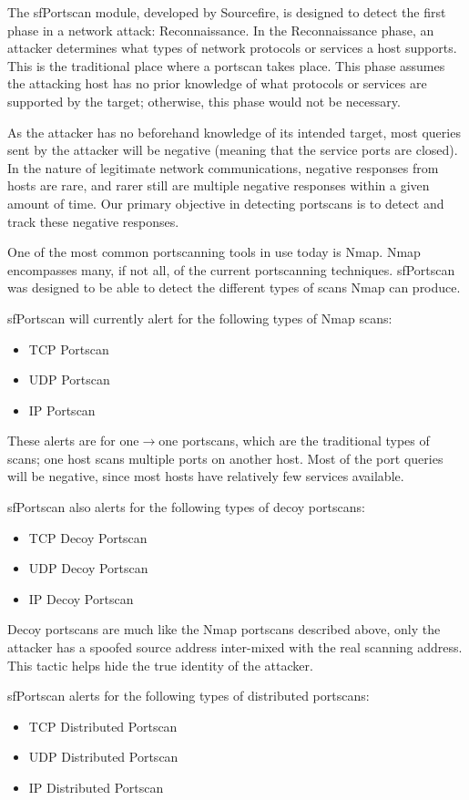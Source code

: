 \documentclass[english]{report}
\begin{document}
The sfPortscan module, developed by Sourcefire, is designed to detect the 
first phase in a network attack: Reconnaissance. In the Reconnaissance phase, 
an attacker determines
what types of network protocols or services a host supports. This is
the traditional place where a portscan takes place. This phase assumes
the attacking host has no prior knowledge of what protocols or
services are supported by the target; otherwise, this phase would not
be necessary.

As the attacker has no beforehand knowledge of its intended target,
most queries sent by the attacker will be negative (meaning that the
service ports are closed). In the nature of legitimate network
communications, negative responses from hosts are rare, and rarer
still are multiple negative responses within a given amount of time.
Our primary objective in detecting portscans is to detect and track
these negative responses.

One of the most common portscanning tools in use today is Nmap. Nmap
encompasses many, if not all, of the current portscanning techniques.
sfPortscan was designed to be able to detect the different types of
scans Nmap can produce.

sfPortscan will currently alert for the following types of Nmap scans:
\begin{itemize}
\item TCP Portscan
\item UDP Portscan
\item IP Portscan
\end{itemize}

These alerts are for one$\rightarrow$one portscans, which are the traditional
types of scans; one host scans multiple ports on another host. Most of
the port queries will be negative, since most hosts have relatively
few services available.

sfPortscan also alerts for the following types of decoy portscans:
\begin{itemize}
\item TCP Decoy Portscan
\item UDP Decoy Portscan
\item IP Decoy Portscan
\end{itemize}

Decoy portscans are much like the Nmap portscans described above, only the attacker has a spoofed
source address inter-mixed with the real scanning address. This tactic
helps hide the true identity of the attacker.

sfPortscan alerts for the following types of distributed portscans:
\begin{itemize}
\item TCP Distributed Portscan
\item UDP Distributed Portscan
\item IP Distributed Portscan
\end{itemize}
\end{document}
